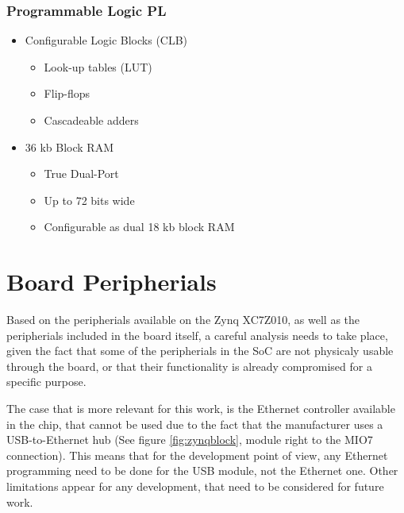 \subsubsection{Programmable Logic PL}

\begin{itemize}
	\item Configurable Logic Blocks (CLB)
	\begin{itemize}
		\item Look-up tables (LUT)
		\item Flip-flops
		\item Cascadeable adders
	\end{itemize}
	\item 36 kb Block RAM
	\begin{itemize}
		\item True Dual-Port
		\item Up to 72 bits wide
		\item Configurable as dual 18 kb block RAM
	\end{itemize}
\end{itemize}

\section{Board Peripherials}

Based on the peripherials available on the Zynq XC7Z010, as well as the peripherials included in the board itself, a careful analysis needs to take place, given the fact that some of the peripherials in the SoC are not physicaly usable through the board, or that their functionality is already compromised for a specific purpose.

The case that is more relevant for this work, is the Ethernet controller available in the chip, that cannot be used due to the fact that the manufacturer uses a USB-to-Ethernet hub (See figure \ref{fig:zynqblock}, module right to the MIO7 connection). This means that for the development point of view, any Ethernet programming need to be done for the USB module, not the Ethernet one. Other limitations appear for any development, that need to be considered for future work.
